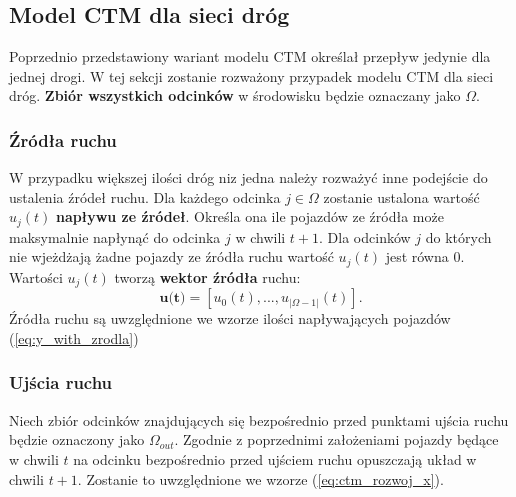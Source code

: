 \documentclass[12pt]{book}
\theoremstyle{plain}
\newcommand{\myref}[1]{(\ref{#1})}
\begin{document}
\subsection{Model CTM dla sieci dróg}
Poprzednio przedstawiony wariant modelu CTM określał przepływ jedynie dla jednej drogi. W tej sekcji zostanie rozważony przypadek modelu CTM dla sieci dróg. \textbf{Zbiór wszystkich odcinków} w środowisku będzie oznaczany jako $\Omega$. 
\subsubsection{Źródła ruchu}
W przypadku większej ilości dróg niz jedna należy rozważyć inne podejście do ustalenia źródeł ruchu. 
Dla każdego odcinka $j \in \Omega$ zostanie ustalona wartość $u_j(t)$ \textbf{napływu ze źródeł}. Określa ona ile pojazdów ze źródła może maksymalnie napłynąć do odcinka $j$ w chwili $t+1$. Dla odcinków $j$ do których nie wjeżdżają żadne pojazdy ze źródła ruchu wartość $u_j(t)$ jest równa 0. Wartości $u_j(t)$ tworzą \textbf{wektor źródła} ruchu:
\[\textbf{u(t)}=[u_0(t),...,u_{|\Omega-1|}(t)].\]
Źródła ruchu są uwzględnione we wzorze ilości napływających pojazdów \myref{eq:y_with_zrodla}
\subsubsection{Ujścia ruchu}
Niech zbiór odcinków znajdujących się bezpośrednio przed punktami ujścia ruchu będzie oznaczony jako $\Omega_{out}$.
Zgodnie z poprzednimi założeniami pojazdy będące w chwili $t$ na odcinku bezpośrednio przed ujściem ruchu opuszczają układ w chwili $t+1$. Zostanie to uwzględnione we wzorze \myref{eq:ctm_rozwoj_x}.
\end{document}
